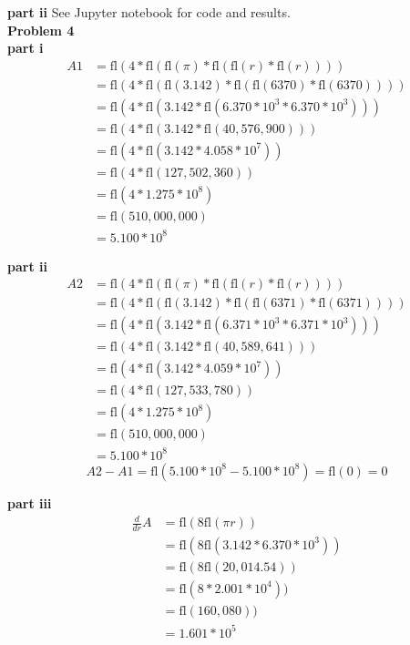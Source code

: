 \documentclass{article} %
\begin{document}
\textbf{part ii}
See Jupyter notebook for code and results.
\\


\textbf{Problem 4} \\
\textbf{part i} 
\begin{align*}
A1 &= \mbox{fl}(4 * \mbox{fl}(\mbox{fl}(\pi) * \mbox{fl}(\mbox{fl}(r)*\mbox{fl}(r)))) \\
  &= \mbox{fl}(4 * \mbox{fl}(\mbox{fl}(3.142) * \mbox{fl}(\mbox{fl}(6370)*\mbox{fl}(6370)))) \\
  &= \mbox{fl}(4 * \mbox{fl}(3.142 * \mbox{fl}(6.370 * 10^3 *6.370* 10^3))) \\
  &= \mbox{fl}(4 * \mbox{fl}(3.142 * \mbox{fl}(40,576,900))) \\
  &= \mbox{fl}(4 * \mbox{fl}(3.142 * 4.058 * 10^7)) \\
  &= \mbox{fl}(4 * \mbox{fl}(127,502,360)) \\
  &= \mbox{fl}(4 * 1.275 * 10^8) \\
  &= \mbox{fl}(510,000,000) \\
  &= 5.100 * 10^8
\end{align*}

\textbf{part ii} 
\begin{align*}
A2 &= \mbox{fl}(4 * \mbox{fl}(\mbox{fl}(\pi) * \mbox{fl}(\mbox{fl}(r)*\mbox{fl}(r)))) \\
  &= \mbox{fl}(4 * \mbox{fl}(\mbox{fl}(3.142) * \mbox{fl}(\mbox{fl}(6371)*\mbox{fl}(6371)))) \\
  &= \mbox{fl}(4 * \mbox{fl}(3.142 * \mbox{fl}(6.371 * 10^3 *6.371* 10^3))) \\
  &= \mbox{fl}(4 * \mbox{fl}(3.142 * \mbox{fl}(40,589,641))) \\
  &= \mbox{fl}(4 * \mbox{fl}(3.142 * 4.059 * 10^7)) \\
  &= \mbox{fl}(4 * \mbox{fl}(127,533,780)) \\
  &= \mbox{fl}(4 * 1.275 * 10^8) \\
  &= \mbox{fl}(510,000,000) \\
  &= 5.100 * 10^8
\end{align*}
\begin{equation*}
A2 - A1 = \mbox{fl}(5.100 * 10^8 - 5.100 * 10^8) = \mbox{fl}(0) = 0
\end{equation*}

\textbf{part iii} \\
\begin{align*}
\frac{d}{dr} A &= \mbox{fl}(8 \mbox{fl}(\pi r)) \\
 &= \mbox{fl}(8 \mbox{fl}(3.142 * 6.370*10^3)) \\
 &= \mbox{fl}(8 \mbox{fl}(20,014.54)) \\
 &= \mbox{fl}(8 * 2.001 * 10^4)) \\
 &= \mbox{fl}(160,080)) \\
 &= 1.601*10^5
\end{align*}
\end{document}
